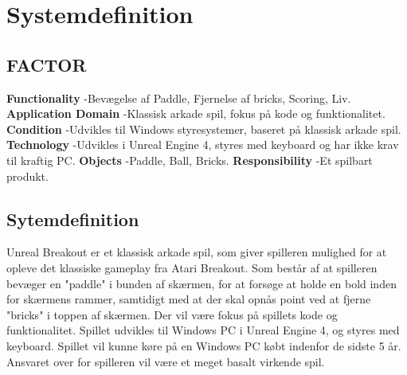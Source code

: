 
\section{Systemdefinition}
\subsection{FACTOR}
\textbf{Functionality}
\newline
-Bevægelse af Paddle, Fjernelse af bricks, Scoring, Liv.
\newline
\textbf{Application Domain}
\newline
-Klassisk arkade spil, fokus på kode
og funktionalitet.
\newline
\textbf{Condition}\newline
-Udvikles til Windows styresystemer, baseret på klassisk arkade spil.
\newline
\textbf{Technology}\newline
-Udvikles i Unreal Engine 4, styres med keyboard og har ikke krav
til kraftig PC.
\newline
\textbf{Objects}\newline
-Paddle, Ball, Bricks.
\newline
\textbf{Responsibility}\newline
-Et spilbart produkt.

\subsection{Sytemdefinition}
Unreal Breakout er et klassisk arkade spil, som giver spilleren mulighed for at opleve det klassiske gameplay fra Atari Breakout. Som består af at spilleren bevæger en "paddle" i bunden af skærmen, for at forsøge at holde en bold inden for skærmens rammer, samtidigt med at der skal opnås point ved at fjerne "bricks" i toppen af skærmen.
Der vil være fokus på spillets kode og funktionalitet. Spillet udvikles til Windows PC
i Unreal Engine 4, og styres med keyboard. Spillet vil kunne køre på en Windows PC købt indenfor de sidste 5 år.
Ansvaret over for spilleren vil være et meget basalt virkende spil.
